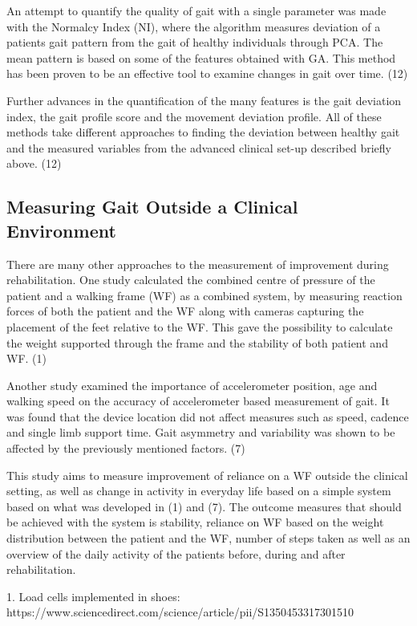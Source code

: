 An attempt to quantify the quality of gait with a single parameter was made with the Normalcy Index (NI), where the algorithm measures deviation of a patients gait pattern from the gait of healthy individuals through PCA. The mean pattern is based on some of the features obtained with GA. This method has been proven to be an effective tool to examine changes in gait over time. (12)

Further advances in the quantification of the many features is the gait deviation index, the gait profile score and the movement deviation profile. All of these methods take different approaches to finding the deviation between healthy gait and the measured variables from the advanced clinical set-up described briefly above. (12)

\subsection{Measuring Gait Outside a Clinical Environment}

There are many other approaches to the measurement of improvement during rehabilitation. One study calculated the combined centre of pressure of the patient and a walking frame (WF) as a combined system, by measuring reaction forces of both the patient and the WF along with cameras capturing the placement of the feet relative to the WF. This gave the possibility to calculate the weight supported through the frame and the stability of both patient and WF. (1)

Another study examined the importance of accelerometer position, age and walking speed on the accuracy of accelerometer based measurement of gait. It was found that the device location did not affect measures such as speed, cadence and single limb support time. Gait asymmetry and variability was shown to be affected by the previously mentioned factors. (7)

This study aims to measure improvement of reliance on a WF outside the clinical setting, as well as change in activity in everyday life based on a simple system based on what was developed in (1) and (7). The outcome measures that should be achieved with the system is stability, reliance on WF based on the weight distribution between the patient and the WF, number of steps taken as well as an overview of the daily activity of the patients before, during and after rehabilitation.


1. Load cells implemented in shoes: https://www.sciencedirect.com/science/article/pii/S1350453317301510

